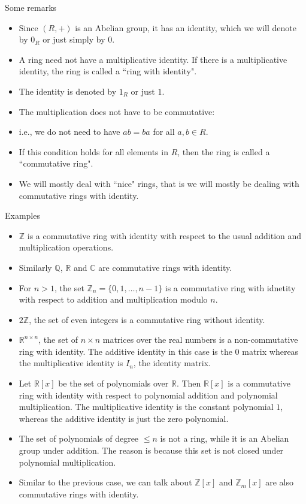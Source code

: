\documentclass[ %
 10pt, xcolor={dvipsnames,svgnames,x11names,hyperref},
   hyperref={colorlinks=true,citecolor=green,linkcolor=DarkRed,urlcolor=ProcessBlue,anchorcolor=blue}
  ]{beamer}
\newenvironment{stepitemize}{\begin{itemize}[<+->]}{\end{itemize} }
\newcommand{\Z}{\mathbb{Z}}
\newcommand{\Q}{\mathbb{Q}}
\newcommand{\R}{\mathbb{R}}
\newcommand{\C}{\mathbb{C}}
\begin{document}
\begin{frame}{Some remarks}
    \begin{stepitemize}
    \item Since $(R,+)$ is an Abelian group, it has an identity, which we will denote by $0_R$ or just simply by $0$.
    \item A ring need not have a multiplicative identity. If there is a multiplicative identity, the ring is called a ``ring with identity".
    \item The identity is denoted by $1_R$ or just $1$.
    \item The multiplication does not have to be commutative: \item i.e., we do not need to have $ab=ba$ for all $a,b \in R$.
    \item If this condition holds for all elements in $R$, then the ring is called a ``commutative ring".
    \item We will mostly deal with ``nice" rings, that is we will mostly be dealing with commutative rings with identity.
    \end{stepitemize}
\end{frame}

\begin{frame}{Examples}
\begin{stepitemize}
\item $\Z$ is a commutative ring with identity with respect to the usual addition and multiplication operations.
    \item Similarly $\Q$, $\R$ and $\C$ are commutative rings with identity.
    \item For $n>1$, the set $\Z_n=\{0,1, \dots, n-1\}$ is a commutative ring with idnetity with respect to addition and multiplication modulo $n$.
    \item $2\Z$, the set of even integers is a commutative ring without identity.
    \item $\R^{n\times n}$, the set of $n\times n$ matrices over the real numbers is a non-commutative ring with identity. The additive identity in this case is the $0$ matrix whereas the multiplicative identity is $I_n$, the identity matrix.
    \item Let $\R[x]$ be the set of polynomials over $\R$. Then $\R[x]$ is a commutative ring with identity with respect to polynomial addition and polynomial multiplication. The multiplicative identity is the constant polynomial $1$, whereas the additive identity is just the zero polynomial.
    \item The set of polynomials of degree $\leq n$ is not a ring, while it is an Abelian group under addition. The reason is because this set is not closed under polynomial multiplication.
    \item Similar to the previous case, we can talk about
    $\Z[x]$ and $\Z_m[x]$ are also commutative rings with identity.
\end{stepitemize}

\end{frame}
\end{document}
